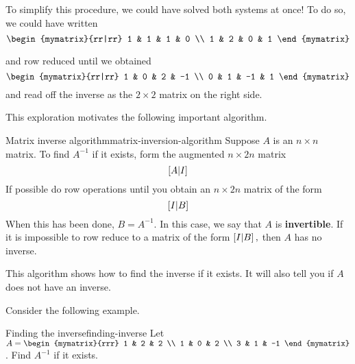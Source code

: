 To simplify this procedure, we could have solved both systems at once!
To do so, we could have written
\begin{equation*}
\begin{mymatrix}{rr|rr}
1 & 1 & 1 & 0 \\
1 & 2 & 0 & 1
\end{mymatrix}
\end{equation*}

and row reduced until we obtained
\begin{equation*}
\begin{mymatrix}{rr|rr}
1 & 0 & 2 & -1 \\
0 & 1 & -1 & 1
\end{mymatrix}
\end{equation*}
and read off the inverse as the $2\times 2$ matrix on the right side.

This exploration motivates the following important algorithm.

\begin{algorithm}{Matrix inverse algorithm}{matrix-inversion-algorithm}
Suppose $A$ is an $n\times n$ matrix. To find $A^{-1}$ if it exists, form
the augmented $n\times 2n$ matrix
\begin{equation*}
\left[A|I\right]
\end{equation*}
If possible do row operations until you obtain an $n\times 2n$
matrix of the form
\begin{equation*}
\left[I|B\right]  
\end{equation*}
When this has been done, $B=A^{-1}.$ In this case, we say that $A$ is \textbf{invertible}. 
If it is impossible to row reduce to a
matrix of the form $\left[I|B\right] ,$ then $A$ has no inverse.
\end{algorithm}

This algorithm shows how to find the inverse if it exists. It will also tell you if
$A$ does not have an inverse. 

Consider the following example.

\begin{example}{Finding the inverse}{finding-inverse}
Let $A=\begin{mymatrix}{rrr}
1 & 2 & 2 \\
1 & 0 & 2 \\
3 & 1 & -1
\end{mymatrix} $. Find $A^{-1}$ if it exists.
\end{example}

